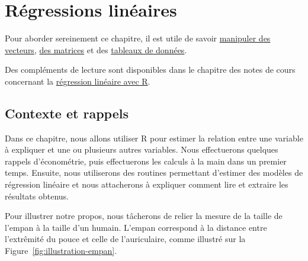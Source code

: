 \documentclass[
  11pt,
]{book}
\numberwithin{equation}{section}
\numberwithin{countremarque}{section}
\newenvironment{orangebox}{
  \begin{tcolorbox}[breakable, colback=oran,coltext=white,
                  colframe=grisfonce]}
 {\end{tcolorbox}}
\begin{document}
\hypertarget{ruxe9gressions-linuxe9aires}{%
\chapter{Régressions linéaires}\label{ruxe9gressions-linuxe9aires}}

\begin{orangebox}
Pour aborder sereinement ce chapitre, il est utile de savoir \href{http://egallic.fr/Enseignement/R/Book/donn\%C3\%A9es.html\#structures-de-base}{manipuler des vecteurs}, \href{http://egallic.fr/Enseignement/R/Book/donn\%C3\%A9es.html\#calculs-matriciels}{des matrices} et des \href{http://egallic.fr/Enseignement/R/Book/donn\%C3\%A9es.html\#tableaux_de_donnees}{tableaux de données}.

Des compléments de lecture sont disponibles dans le chapitre des notes de cours concernant la \href{http://egallic.fr/Enseignement/R/Book/r\%C3\%A9gressions-lin\%C3\%A9aires.html}{régression linéaire avec R}.

\end{orangebox}

\hypertarget{contexte-et-rappels}{%
\section{Contexte et rappels}\label{contexte-et-rappels}}

Dans ce chapitre, nous allons utiliser R pour estimer la relation entre une variable à expliquer et une ou plusieurs autres variables. Nous effectuerons quelques rappels d'économétrie, puis effectuerons les calculs à la main dans un premier temps. Ensuite, nous utiliserons des routines permettant d'estimer des modèles de régression linéaire et nous attacherons à expliquer comment lire et extraire les résultats obtenus.

Pour illustrer notre propos, nous tâcherons de relier la mesure de la taille de l'empan à la taille d'un humain. L'empan correspond à la distance entre l'extrêmité du pouce et celle de l'auriculaire, comme illustré sur la Figure~\ref{fig:illustration-empan}.
\end{document}

